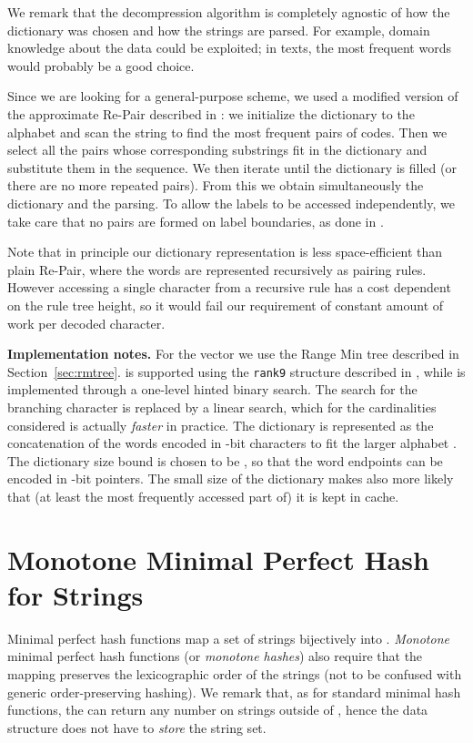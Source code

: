 \documentclass[a4paper,11pt]{article}
\newcommand{\ttlpar}[1]{\noindent\textbf{#1}}
\theoremstyle{nonumberplain}
\begin{document}
We remark that the decompression algorithm is completely agnostic of
how the dictionary was chosen and how the strings are parsed. For example, 
domain knowledge about the data could be exploited; in texts, the most
frequent words would probably be a good choice. 

Since we are looking for a general-purpose scheme, we used a modified
version of the approximate Re-Pair \cite{repair} described in
\cite{navarrorepair}: we initialize the dictionary to the alphabet
 and scan the string to find the  most frequent pairs of
codes. Then we select all the pairs whose corresponding substrings fit
in the dictionary and substitute them in the sequence. We then iterate
until the dictionary is filled (or there are no more repeated pairs).
From this we obtain simultaneously the dictionary and the parsing.
To allow the labels to be accessed independently, we take care that no
pairs are formed on label boundaries, as done in \cite{csd11}.

Note that in principle our dictionary representation is less
space-efficient than plain Re-Pair, where the words are represented
recursively as pairing rules. However accessing a single character
from a recursive rule has a cost dependent on the rule tree height, so
it would fail our requirement of constant amount of work per decoded
character.

\ttlpar{Implementation notes.} 
For the  vector we use the Range Min tree described in
Section~\ref{sec:rmtree}.  is supported using the
\texttt{rank9} structure described in \cite{vigna08}, while 
is implemented through a one-level hinted binary search. The search for
the branching character is replaced by a linear search, which for the
cardinalities considered is actually \emph{faster} in practice. 
The dictionary is represented as the concatenation of the
words encoded in -bit characters to fit the larger alphabet
. The dictionary size bound  is chosen to be
, so that the word endpoints can be encoded in -bit
pointers. The small size of the dictionary makes also more likely that
(at least the most frequently accessed part of) it is kept in cache.



\section{Monotone Minimal Perfect Hash for Strings}
\label{sec:hollow}

Minimal perfect hash functions map a set of strings 
bijectively into . \emph{Monotone} minimal perfect
hash functions \cite{monotonehashsoda} (or \emph{monotone hashes})
also require that the mapping preserves the lexicographic order of the
strings (not to be confused with generic order-preserving hashing).
We remark that, as for standard minimal hash functions, the 
can return any number on strings outside of , hence the
data structure does not have to \emph{store} the string set.
\end{document}
